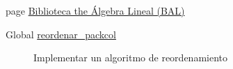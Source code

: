 \label{todo__todo000001}
\hypertarget{todo__todo000001}{}
 \begin{description}
\item[page \hyperlink{index}{Biblioteca the Álgebra Lineal (BAL)} ]

\end{description}


\label{todo__todo000002}
\hypertarget{todo__todo000002}{}
 \begin{description}
\item[Global \hyperlink{reordenamiento_8c_a1a7373269a886624a8371feb7bf6066}{reordenar\_\-packcol} ]Implementar un algoritmo de reordenamiento

\end{description}
